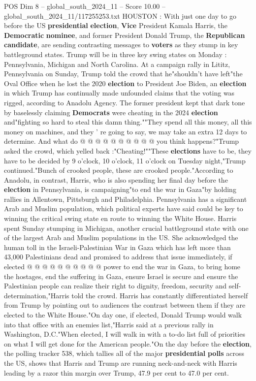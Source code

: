 \begin{textsample}{POS Dim 8 – global\_south\_2024\_11 – Score 10.00 – global\_south\_2024\_11/117255253.txt}  \label{ex:f8_pos_145}
HOUSTON : With just one day to go before the US \textbf{presidential} \textbf{election}, \textbf{Vice} President Kamala Harris, the \textbf{Democratic} \textbf{nominee}, and former President Donald Trump, the \textbf{Republican} \textbf{candidate}, are sending contrasting messages to \textbf{voters} as they stump in key battleground states.
Trump will be in three key swing states on Monday : Pennsylvania, Michigan and North Carolina.
At a campaign rally in Lititz, Pennsylvania on Sunday, Trump told the crowd that he"shouldn't have left"the Oval Office when he lost the 2020 \textbf{election} to President Joe Biden, an \textbf{election} in which Trump has continually made unfounded claims that the voting was rigged, according to Anadolu Agency.
The former president kept that dark tone by baselessly claiming \textbf{Democrats} were cheating in the 2024 \textbf{election} and"fighting so hard to steal this damn thing.""They spend all this money, all this money on machines, and they ' re going to say, we may take an extra 12 days to determine.
And what do @ @ @ @ @ @ @ @ @ @ you think happens?"Trump asked the crowd, which yelled back :"Cheating!""These \textbf{elections} have to be, they have to be decided by 9 o'clock, 10 o'clock, 11 o'clock on Tuesday night,"Trump continued."Bunch of crooked people, these are crooked people."According to Anadolu, in contrast, Harris, who is also spending her final day before the \textbf{election} in Pennsylvania, is campaigning"to end the war in Gaza"by holding rallies in Allentown, Pittsburgh and Philadelphia.
Pennsylvania has a significant Arab and Muslim population, which political experts have said could be key to winning the critical swing state en route to winning the White House.
Harris spent Sunday stumping in Michigan, another crucial battleground state with one of the largest Arab and Muslim populations in the US.
She acknowledged the human toll in the Israeli-Palestinian War in Gaza which has left more than 43,000 Palestinians dead and promised to address that issue immediately, if elected @ @ @ @ @ @ @ @ @ @ power to end the war in Gaza, to bring home the hostages, end the suffering in Gaza, ensure Israel is secure and ensure the Palestinian people can realize their right to dignity, freedom, security and self-determination,"Harris told the crowd.
Harris has constantly differentiated herself from Trump by pointing out to audiences the contrast between them if they are elected to the White House."On day one, if elected, Donald Trump would walk into that office with an enemies list,"Harris said at a previous rally in Washington, D.C."When elected, I will walk in with a to-do list full of priorities on what I will get done for the American people."On the day before the \textbf{election}, the polling tracker 538, which tallies all of the major \textbf{presidential} \textbf{polls} across the US, shows that Harris and Trump are running neck-and-neck with Harris leading by a razor thin margin over Trump, 47.9 per cent to 47.0 per cent.

\end{textsample}
